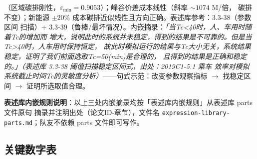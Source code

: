 \documentclass{internal-report}
\begin{document}
\begin{enumerate}
        （区域碳排刚性，$\varepsilon_{\min}=0.9053$）；峰谷价差成本线性（斜率 $\sim 1074$ M/倍，
        碳排不变）；新能源 $\pm20\%$ 成本碳排近似线性且方向正确。表述库参考：3.3-38（参数区间
        扫描）+ 3.3-39（鲁棒/最坏情况）。内嵌摘录：\emph{「当Tc<40时，人、车用时随着Tc的增加而
        增大，说明此时的系统并未稳定，得到的结果是不可靠的。但是当Tc>40时，人车用时保持恒定，
        故此时模拟运行的结果与Tc大小无关，系统结果稳定，证明了我们前面选取Tc=50(min)是合理的，
        且得到的结果是正确和稳定的。」（表述库 3.3-38 阈值扫描稳定区间式，出处：2019C1-5.1 乘车
        效率对模拟系统截止时间Tc的灵敏度分析）}——句式示范：改变参数观察指标 $\to$ 找稳定区间 $\to$
        证明所选取值合理。
\end{enumerate}

\textbf{表述库内嵌规则说明}：以上三处内嵌摘录均按「表述库内嵌规则」从表述库 parts 文件原句
摘录并注明出处（论文ID-章节），文件名 \texttt{expression-library-parts.md}；队友不依赖
parts 文件即可写作。

\subsection{关键数字表}
\end{document}
